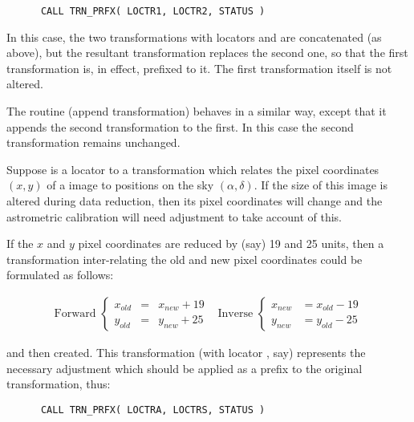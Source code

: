 \begin{verbatim}
      CALL TRN_PRFX( LOCTR1, LOCTR2, STATUS )
\end{verbatim}

In this case, the two transformations with locators  and
 are concatenated (as above), but the resultant
transformation replaces the second one, so that the first transformation is,
in effect, prefixed to it. 
The first transformation itself is not altered.

The routine  (append transformation) behaves in a similar
way, except that it appends the second transformation to the first. In this
case the second transformation remains unchanged. 

Suppose  is a locator to a transformation which relates the
pixel coordinates \mbox{$(x,y)$} of a  image to positions on the
sky \mbox{$(\alpha,\delta)$}. 
If the size of this image is altered during data reduction, then its pixel
coordinates will change and the astrometric calibration will need adjustment
to take account of this. 

If the $x$ and $y$ pixel coordinates are reduced by (say) 19 and 25 units,
then a transformation inter-relating the old and new pixel coordinates could
be formulated as follows: 

\begin{equation}
\begin{array}{cc}

\mbox{Forward } \left\{
\begin{array}{lll}
x_{old} & = & x_{new} + 19 \\
y_{old} & = & y_{new} + 25
\end{array}
\right.
&
\mbox{Inverse } \left\{
\begin{array}{lll}
x_{new} & = x_{old} - 19 \\
y_{new} & = y_{old} - 25
\end{array}
\right.

\end{array}
\end{equation}

and then created.
This transformation (with locator , say) represents the
necessary adjustment which should be applied as a prefix to the original
transformation, thus: 

\begin{verbatim}
      CALL TRN_PRFX( LOCTRA, LOCTRS, STATUS )
\end{verbatim}

